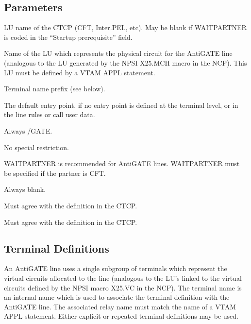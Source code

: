 \documentclass[letterpaper,10pt,english]{sphinxmanual}
\begin{document}
\subsection{Parameters}
\label{\detokenize{connectivity_guide:index-75}}\label{\detokenize{connectivity_guide:id34}}\begin{description}
\sphinxAtStartPar
LU name of the CTCP (CFT, Inter.PEL, etc). May be blank if WAIT\sphinxhyphen{}PARTNER is coded in the “Startup pre\sphinxhyphen{}requisite” field.

\sphinxAtStartPar
Name of the LU which represents the physical circuit for the AntiGATE line (analogous to the LU generated by the NPSI X25.MCH
macro in the NCP). This LU must be defined by a VTAM APPL statement.

\sphinxAtStartPar
Terminal name prefix (see below).

\sphinxAtStartPar
The default entry point, if no entry point is defined at the terminal level, or in the line rules or call user data.

\sphinxAtStartPar
Always /GATE.

\sphinxAtStartPar
No special restriction.

\sphinxAtStartPar
WAIT\sphinxhyphen{}PARTNER is recommended for AntiGATE lines. WAIT\sphinxhyphen{}PARTNER must be specified if the partner is CFT.

\sphinxAtStartPar
Always blank.

\sphinxAtStartPar
Must agree with the definition in the CTCP.

\sphinxAtStartPar
Must agree with the definition in the CTCP.

\end{description}

\ignorespaces 

\subsection{Terminal Definitions}
\label{\detokenize{connectivity_guide:index-76}}\label{\detokenize{connectivity_guide:id35}}
\sphinxAtStartPar
An AntiGATE line uses a single sub\sphinxhyphen{}group of terminals which represent the virtual circuits allocated to the line (analogous to the LU’s linked to the virtual circuits defined by the NPSI macro X25.VC in the NCP). The terminal name is an internal name which is used to associate the terminal definition with the AntiGATE line. The associated relay name must match the name of a VTAM APPL statement. Either explicit or repeated terminal definitions may be used.
\end{document}
